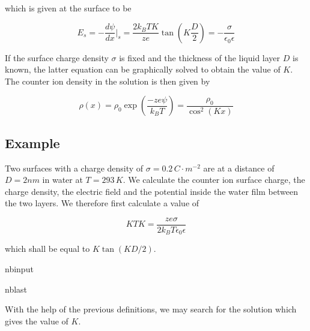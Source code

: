 \documentclass[letterpaper,10pt,english]{sphinxmanual}
\begin{document}
\sphinxAtStartPar
which is given at the surface to be

\sphinxAtStartPar
\begin{equation}
E_{s}=-\frac{d\psi}{dx}\bigg|_s = \frac{2k_B T K}{z e}\tan\left (K \frac{D}{2}\right)=-\frac{\sigma}{\epsilon_0 \epsilon}
\end{equation}

\sphinxAtStartPar
If the surface charge density \(\sigma\) is fixed and the thickness of the liquid layer \(D\) is known, the latter equation can be graphically solved to obtain the value of \(K\). The counter ion density in the solution is then given by

\sphinxAtStartPar
\begin{equation}
\rho(x)=\rho_0\exp\left (\frac{-ze\psi }{k_B T}\right)=\frac{\rho_0}{\cos^{2}(Kx)}
\end{equation}


\subsection{Example}
\label{\detokenize{notebooks/L9/1_Electric_Double_Layer:Example}}
\sphinxAtStartPar
Two surfaces with a charge density of \(\sigma=0.2\, C\cdot m^{-2}\) are at a distance of \(D=2 nm\) in water at \(T=293\,K\). We calculate the counter ion surface charge, the charge density, the electric field and the potential inside the water film between the two layers. We therefore first calculate a value of

\sphinxAtStartPar
\begin{equation}
KTK=\frac{ze\sigma}{2k_B T\epsilon_0\epsilon}
\end{equation}

\sphinxAtStartPar
which shall be equal to \(K\tan\left (KD/2\right )\).

\begin{sphinxuseclass}{nbinput}
\begin{sphinxuseclass}{nblast}
{
\begin{sphinxVerbatim}[commandchars=\\\{\}]
\llap{\color{nbsphinxin}[225]:\,\hspace{\fboxrule}\hspace{\fboxsep}} 
 
 
 

\end{sphinxVerbatim}
}

\end{sphinxuseclass}
\end{sphinxuseclass}
\sphinxAtStartPar
With the help of the previous definitions, we may search for the solution which gives the value of \(K\).
\end{document}
